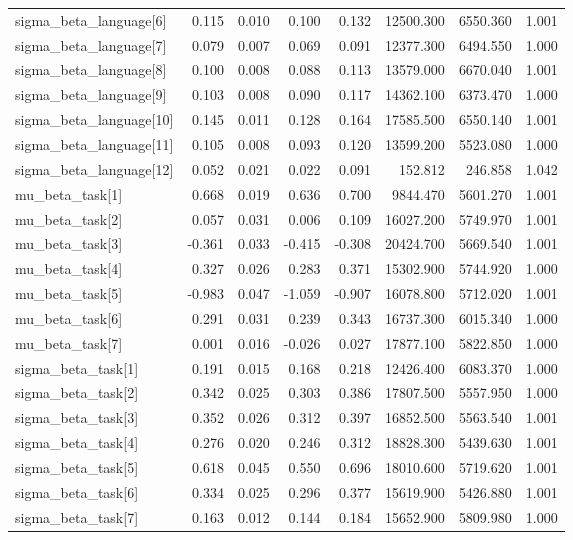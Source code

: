 \begin{tabular}{lrrrrrrr}
sigma\_beta\_language[6] & 0.115 & 0.010 & 0.100 & 0.132 & 12500.300 & 6550.360 & 1.001 \\
sigma\_beta\_language[7] & 0.079 & 0.007 & 0.069 & 0.091 & 12377.300 & 6494.550 & 1.000 \\
sigma\_beta\_language[8] & 0.100 & 0.008 & 0.088 & 0.113 & 13579.000 & 6670.040 & 1.001 \\
sigma\_beta\_language[9] & 0.103 & 0.008 & 0.090 & 0.117 & 14362.100 & 6373.470 & 1.000 \\
sigma\_beta\_language[10] & 0.145 & 0.011 & 0.128 & 0.164 & 17585.500 & 6550.140 & 1.001 \\
sigma\_beta\_language[11] & 0.105 & 0.008 & 0.093 & 0.120 & 13599.200 & 5523.080 & 1.000 \\
sigma\_beta\_language[12] & 0.052 & 0.021 & 0.022 & 0.091 & 152.812 & 246.858 & 1.042 \\
mu\_beta\_task[1] & 0.668 & 0.019 & 0.636 & 0.700 & 9844.470 & 5601.270 & 1.001 \\
mu\_beta\_task[2] & 0.057 & 0.031 & 0.006 & 0.109 & 16027.200 & 5749.970 & 1.001 \\
mu\_beta\_task[3] & -0.361 & 0.033 & -0.415 & -0.308 & 20424.700 & 5669.540 & 1.001 \\
mu\_beta\_task[4] & 0.327 & 0.026 & 0.283 & 0.371 & 15302.900 & 5744.920 & 1.000 \\
mu\_beta\_task[5] & -0.983 & 0.047 & -1.059 & -0.907 & 16078.800 & 5712.020 & 1.001 \\
mu\_beta\_task[6] & 0.291 & 0.031 & 0.239 & 0.343 & 16737.300 & 6015.340 & 1.000 \\
mu\_beta\_task[7] & 0.001 & 0.016 & -0.026 & 0.027 & 17877.100 & 5822.850 & 1.000 \\
sigma\_beta\_task[1] & 0.191 & 0.015 & 0.168 & 0.218 & 12426.400 & 6083.370 & 1.000 \\
sigma\_beta\_task[2] & 0.342 & 0.025 & 0.303 & 0.386 & 17807.500 & 5557.950 & 1.000 \\
sigma\_beta\_task[3] & 0.352 & 0.026 & 0.312 & 0.397 & 16852.500 & 5563.540 & 1.001 \\
sigma\_beta\_task[4] & 0.276 & 0.020 & 0.246 & 0.312 & 18828.300 & 5439.630 & 1.001 \\
sigma\_beta\_task[5] & 0.618 & 0.045 & 0.550 & 0.696 & 18010.600 & 5719.620 & 1.001 \\
sigma\_beta\_task[6] & 0.334 & 0.025 & 0.296 & 0.377 & 15619.900 & 5426.880 & 1.001 \\
sigma\_beta\_task[7] & 0.163 & 0.012 & 0.144 & 0.184 & 15652.900 & 5809.980 & 1.000 \\

\end{tabular}
